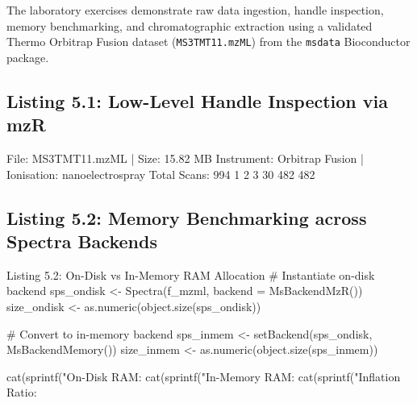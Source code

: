 \documentclass[11pt,twoside,openright]{book}
\begin{document}
The laboratory exercises demonstrate raw data ingestion, handle inspection, memory benchmarking, and chromatographic extraction using a validated Thermo Orbitrap Fusion dataset (\texttt{MS3TMT11.mzML}) from the \texttt{msdata} Bioconductor package.

\subsection{Listing 5.1: Low-Level Handle Inspection via mzR}


\begin{routput}
File: MS3TMT11.mzML | Size: 15.82 MB
Instrument: Orbitrap Fusion | Ionisation: nanoelectrospray
Total Scans: 994
 1   2   3 
30 482 482 
\end{routput}

\subsection{Listing 5.2: Memory Benchmarking across Spectra Backends}

\begin{rchunk}{Listing 5.2: On-Disk vs In-Memory RAM Allocation}
# Instantiate on-disk backend
sps_ondisk <- Spectra(f_mzml, backend = MsBackendMzR())
size_ondisk <- as.numeric(object.size(sps_ondisk))

# Convert to in-memory backend
sps_inmem <- setBackend(sps_ondisk, MsBackendMemory())
size_inmem <- as.numeric(object.size(sps_inmem))

cat(sprintf("On-Disk RAM:   %
cat(sprintf("In-Memory RAM: %
cat(sprintf("Inflation Ratio: %
\end{rchunk}
\end{document}
